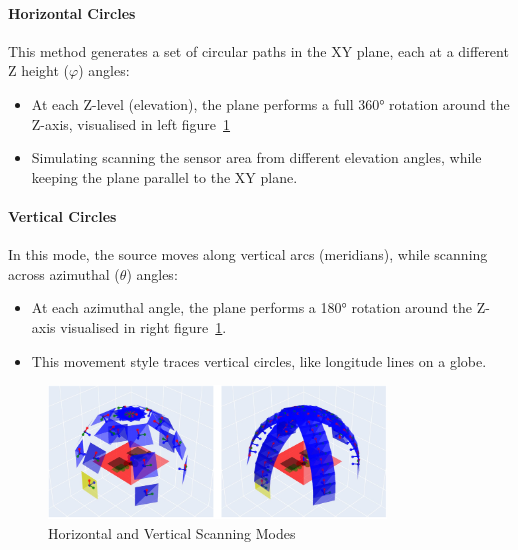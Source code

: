 \paragraph{Horizontal Circles}

This method generates a set of circular paths in the XY plane, each at a different Z height ($\varphi$) angles:

\begin{itemize}
    \item At each Z-level (elevation), the plane performs a full 360° rotation around the Z-axis, visualised in left figure~\ref{fig:Horizontal and Vertical Scanning Modes}
    \item Simulating scanning the sensor area from different elevation angles, while keeping the plane parallel to the XY plane. 
\end{itemize}

\paragraph{Vertical Circles}

In this mode, the source moves along vertical arcs (meridians), while scanning across azimuthal ($\theta$) angles:

\begin{itemize}
    \item At each azimuthal angle, the plane performs a 180° rotation around the Z-axis visualised in right figure~\ref{fig:Horizontal and Vertical Scanning Modes}.
    \item This movement style traces vertical circles, like longitude lines on a globe.
\end{itemize}

\begin{figure}[htbp] %
    \centering
    \includegraphics[width=0.8\textwidth]{chapters/methodology/SoftwareModel/images/Other movements.png} %
    \caption{Horizontal and Vertical Scanning Modes}       %
    \label{fig:Horizontal and Vertical Scanning Modes}            %
\end{figure}  

